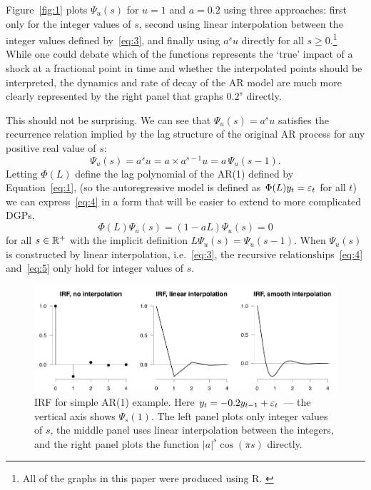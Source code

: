 \documentclass[AER,reviewmode]{tex/AEA}
\begin{document}
Figure~\ref{fig:1} plots $\Psi_u(s)$ for $u = 1$ and $a = 0.2$ using
three approaches: first only for the integer values of $s$, second
using linear interpolation between the integer values defined
by~\eqref{eq:3}, and finally using $a^s u$ directly for all
$s \geq 0$.\footnote{%
  All of the graphs in this paper were produced using R. \citep{R}} %
While one could debate which of the functions represents the `true'
impact of a shock at a fractional point in time and whether the
interpolated points should be interpreted, the dynamics and rate of
decay of the AR model are much more clearly represented by the right
panel that graphs $0.2^s$ directly.

This should not be surprising. We can see that $\Psi_u(s) = a^s u$
satisfies the recurrence relation implied by the lag structure of the
original AR process for any positive real value of $s$:
\begin{equation}
  \label{eq:4}
  \Psi_u(s) = a^s u = a \times a^{s-1} u = a \, \Psi_u(s-1).
\end{equation}
Letting $\Phi(L)$ define the lag polynomial of the AR(1) defined by
Equation~\eqref{eq:1}, (so the autoregressive model is defined as
$\Phi(L)y_t = \varepsilon_t$ for all $t$) we can express~\eqref{eq:4} in a
form that will be easier to extend to more complicated DGPs,
\begin{equation}
  \label{eq:5}
  \Phi(L) \Psi_u(s) = (1 - a L) \Psi_{u}(s) = 0
\end{equation}
for all $s \in \mathbb{R}^+$ with the implicit definition
$L \Psi_u(s) = \Psi_u(s-1)$. When $\Psi_u(s)$ is constructed by linear
interpolation, i.e.~\eqref{eq:3}, the recursive
relationships~\eqref{eq:4} and~\eqref{eq:5} only hold for integer
values of $s$.

\begin{figure}[t]
  \centering
  \includegraphics[width=5.5in]{graphs/motivation2.pdf}
  \caption{IRF for simple AR(1) example. Here $y_t = -0.2 y_{t-1} +
    \varepsilon_t$ --- the vertical axis shows $\Psi_s(1)$. The left panel
    plots only integer values of $s$, the middle panel uses linear
    interpolation between the integers, and the right panel plots the
    function $|a|^s \cos(\pi s)$ directly.}
  \label{fig:2}
\end{figure}
\end{document}
